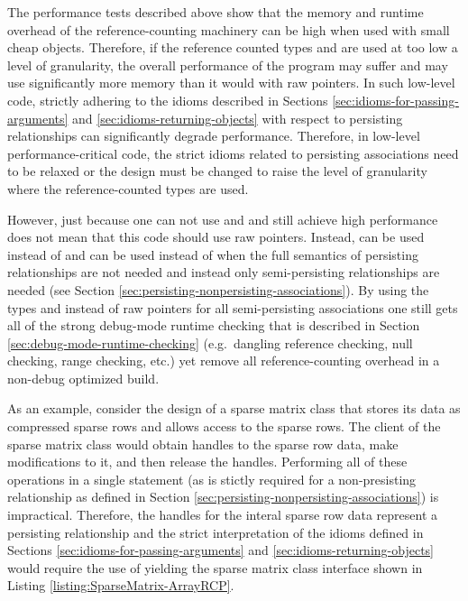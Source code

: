 \documentclass[pdf,ps2pdf,11pt]{SANDreport}
\begin{document}
The performance tests described above show that the memory and runtime
overhead of the reference-counting machinery can be high when used
with small cheap objects.  Therefore, if the reference counted types
{} and {} are used at too low a level of
granularity, the overall performance of the program may suffer and may
use significantly more memory than it would with raw pointers.  In
such low-level code, strictly adhering to the idioms described in
Sections {}\ref{sec:idioms-for-passing-arguments} and
{}\ref{sec:idioms-returning-objects} with respect to persisting
relationships can significantly degrade performance.  Therefore, in
low-level performance-critical code, the strict idioms related to
persisting associations need to be relaxed or the design must be
changed to raise the level of granularity where the reference-counted
types are used.

However, just because one can not use {} and {}
and still achieve high performance does not mean that this code should
use raw pointers.  Instead, {} can be used instead of
{} and {} can be used instead of
{} when the full semantics of persisting relationships
are not needed and instead only semi-persisting relationships are
needed (see Section
{}\ref{sec:persisting-nonpersisting-associations}).  By using the
types {} and {} instead of raw pointers for
all semi-persisting associations one still gets all of the strong
debug-mode runtime checking that is described in Section
{}\ref{sec:debug-mode-runtime-checking} (e.g.\ dangling reference
checking, null checking, range checking, etc.) yet remove all
reference-counting overhead in a non-debug optimized build.

As an example, consider the design of a sparse matrix class that
stores its data as compressed sparse rows and allows access to the
sparse rows.  The client of the sparse matrix class would obtain
handles to the sparse row data, make modifications to it, and then
release the handles.  Performing all of these operations in a single
statement (as is stictly required for a non-presisting relationship as
defined in Section {}\ref{sec:persisting-nonpersisting-associations})
is impractical.  Therefore, the handles for the interal sparse row
data represent a persisting relationship and the strict interpretation
of the idioms defined in Sections
{}\ref{sec:idioms-for-passing-arguments} and
{}\ref{sec:idioms-returning-objects} would require the use of
{} yielding the sparse matrix class interface shown
in Listing {}\ref{listing:SparseMatrix-ArrayRCP}.
\end{document}
